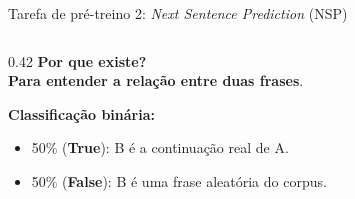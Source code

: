 \begin{frame}{Tarefa de pré-treino 2: \textit{Next Sentence Prediction} (NSP)}
    \begin{columns}[c]
        \begin{column}{0.42\textwidth}
            \scriptsize
            {\color{dexpiBlue}\textbf{Por que existe?}} \\
            \textbf{Para entender a relação entre duas frases}.

            \vspace{0.25cm}
            {\color{dexpiBlue}\textbf{Classificação binária:}}\par

            \begin{itemize}\setlength{\itemsep}{0pt}
                \item 50\% ({\color{dexpiGreenDark}\textbf{True}}): B é a continuação real de A.
                \item 50\% ({\color{dexpiRedDark}\textbf{False}}): B é uma frase aleatória do corpus.
            \end{itemize}


\end{column}
\end{columns}
\end{frame}
